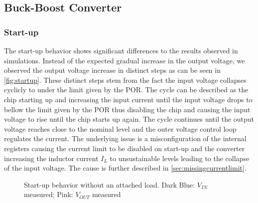 \clearpage


\subsection{Buck-Boost Converter}

\subsubsection{Start-up}
\label{sec:startup}
The start-up behavior shows significant differences to the results observed in simulations. Instead of the expected gradual increase in the output voltage, we observed the output voltage increase in distinct steps as can be seen in \autoref{fig:startup}. These distinct steps stem from the fact the input voltage collapses cyclicly to under the limit given by the \ac{POR}. The cycle can be described as the chip starting up and increasing the input current until the input voltage drops to bellow the limit given by the \ac{POR} thus disabling the chip and causing the input voltage to rise until the chip starts up again. The cycle continues until the output voltage reaches close to the nominal level and the outer voltage control loop regulates the current.  
The underlying issue is a misconfiguration of the internal registers causing the current limit to be disabled on start-up and the converter increasing the inductor current $I_L$ to unsustainable levels leading to the collapse of the input voltage. The cause is further described in \autoref{sec:missingcurrentlimit}.

\begin{figure}[ht]
	\centering
	
	\caption{Start-up behavior without an attached load. Dark Blue: $V_{IN}$ measured; Pink: $V_{OUT}$ measured}
	\label{fig:startup}
\end{figure}


